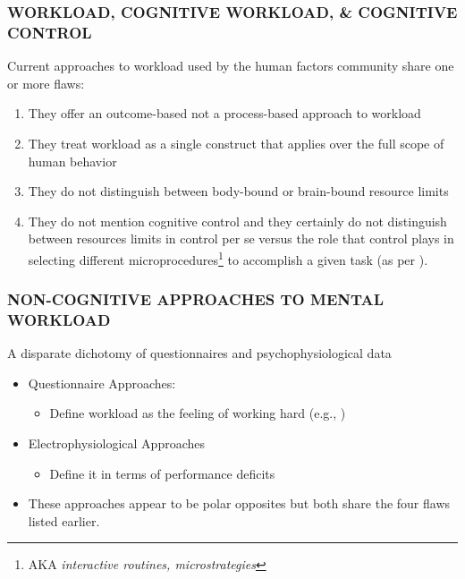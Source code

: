\documentclass{beamer}
\begin{document}
\begin{frame}[label=4flaws]
	\frametitle{WORKLOAD, COGNITIVE WORKLOAD, \& COGNITIVE CONTROL}
	Current approaches to workload used by the human factors community share one or more flaws:
	\pause
	\begin{enumerate}[<+-| alert@+>]
		\item They offer an outcome-based not a process-based approach to workload
		\item They treat workload as a single construct that applies over the full scope of human behavior
		\item They do not distinguish between body-bound or brain-bound resource limits
		\item They do not mention cognitive control and they certainly do not distinguish between resources limits in control per se versus the role that control plays in selecting different \alert{microprocedures}\footnote[frame]{AKA \emph{interactive routines, microstrategies}} to accomplish a given task (as per ).
	\end{enumerate}
	\vspace{.7cm}
\end{frame}

\begin{frame}
	\frametitle{NON-COGNITIVE APPROACHES TO MENTAL WORKLOAD}
	A disparate dichotomy of questionnaires and psychophysiological data					\begin{itemize} 
		\item Questionnaire Approaches:
		\begin{itemize}
			\item Define workload as the feeling of working hard (e.g., )
		\end{itemize}
		\item Electrophysiological Approaches
		\begin{itemize}
			\item Define it in terms of performance deficits
		\end{itemize}
		\item These approaches appear to be polar opposites but both share the four flaws listed earlier.
	\end{itemize}
\end{frame}
\end{document}
